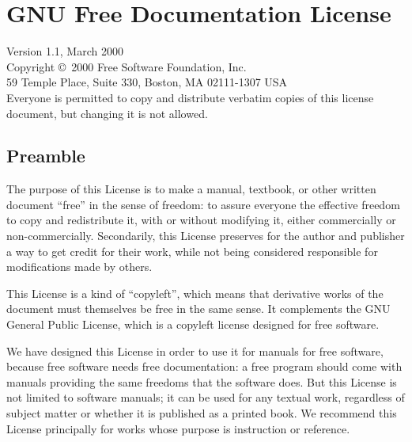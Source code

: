 \chapter{GNU Free Documentation License}
\label{gfdl}



\begingroup
    \small

    Version 1.1, March 2000\\

    Copyright \copyright\ 2000  Free Software Foundation, Inc.\\
        59 Temple Place, Suite 330, Boston, MA  02111-1307  USA\\
    Everyone is permitted to copy and distribute verbatim copies
    of this license document, but changing it is not allowed.

    \section*{Preamble}

    The purpose of this License is to make a manual, textbook, or other
    written document ``free'' in the sense of freedom: to assure everyone
    the effective freedom to copy and redistribute it, with or without
    modifying it, either commercially or non-commercially.  Secondarily,
    this License preserves for the author and publisher a way to get
    credit for their work, while not being considered responsible for
    modifications made by others.

    This License is a kind of ``copyleft'', which means that derivative
    works of the document must themselves be free in the same sense.  It
    complements the GNU General Public License, which is a copyleft
    license designed for free software.

    We have designed this License in order to use it for manuals for free
    software, because free software needs free documentation: a free
    program should come with manuals providing the same freedoms that the
    software does.  But this License is not limited to software manuals;
    it can be used for any textual work, regardless of subject matter or
    whether it is published as a printed book.  We recommend this License
    principally for works whose purpose is instruction or reference.

